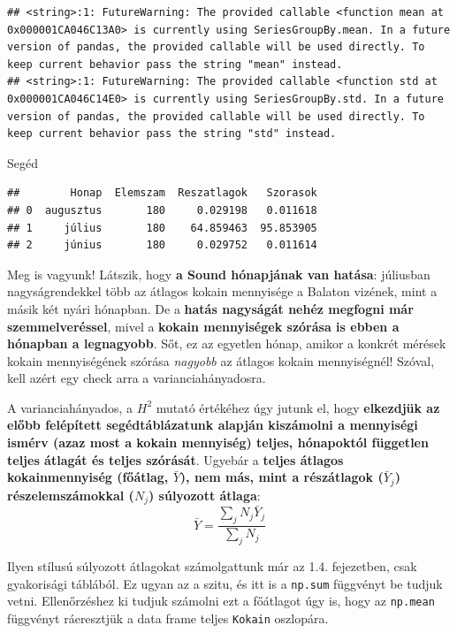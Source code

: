 \documentclass[
]{book}
\newenvironment{Shaded}{\begin{snugshade}}{\end{snugshade}}
\newcommand{\NormalTok}[1]{#1}
\begin{document}
\begin{verbatim}
## <string>:1: FutureWarning: The provided callable <function mean at 0x000001CA046C13A0> is currently using SeriesGroupBy.mean. In a future version of pandas, the provided callable will be used directly. To keep current behavior pass the string "mean" instead.
## <string>:1: FutureWarning: The provided callable <function std at 0x000001CA046C14E0> is currently using SeriesGroupBy.std. In a future version of pandas, the provided callable will be used directly. To keep current behavior pass the string "std" instead.
\end{verbatim}

\begin{Shaded}
\begin{Highlighting}[]
\NormalTok{Segéd}
\end{Highlighting}
\end{Shaded}

\begin{verbatim}
##        Honap  Elemszam  Reszatlagok   Szorasok
## 0  augusztus       180     0.029198   0.011618
## 1     július       180    64.859463  95.853905
## 2     június       180     0.029752   0.011614
\end{verbatim}

Meg is vagyunk! Látszik, hogy \textbf{a Sound hónapjának van hatása}: júliusban nagyságrendekkel több az átlagos kokain mennyisége a Balaton vizének, mint a másik két nyári hónapban. De a \textbf{hatás nagyságát nehéz megfogni már szemmelveréssel}, mivel a \textbf{kokain mennyiségek szórása is ebben a hónapban a legnagyobb}. Sőt, ez az egyetlen hónap, amikor a konkrét mérések kokain mennyiségének szórása \emph{nagyobb} az átlagos kokain mennyiségnél! Szóval, kell azért egy check arra a varianciahányadosra.

A varianciahányados, a \(H^2\) mutató értékéhez úgy jutunk el, hogy \textbf{elkezdjük az előbb felépített segédtáblázatunk alapján kiszámolni a mennyiségi ismérv (azaz most a kokain mennyiség) teljes, hónapoktól független teljes átlagát és teljes szórását}. Ugyebár a \textbf{teljes átlagos kokainmennyiség (főátlag, \(\bar{Y}\)), nem más, mint a részátlagok (\(\bar{Y}_j\)) részelemszámokkal (\(N_j\)) súlyozott átlaga}: \[\bar{Y}=\frac{\sum_j{N_j\bar{Y}_j}}{\sum_j{N_j}}\]

Ilyen stílusú súlyozott átlagokat számolgattunk már az 1.4. fejezetben, csak gyakorisági táblából. Ez ugyan az a szitu, és itt is a \texttt{np.sum} függvényt be tudjuk vetni. Ellenőrzéshez ki tudjuk számolni ezt a főátlagot úgy is, hogy az \texttt{np.mean} függvényt ráeresztjük a data frame teljes \texttt{Kokain} oszlopára.
\end{document}
